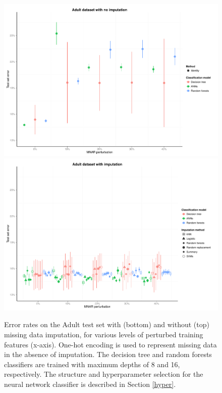 \documentclass[10pt,twocolumn,letterpaper]{article}
\begin{document}
\begin{figure}[htbp] 
   \begin{center}
   \includegraphics[scale=0.5]{figure/test-errors-adult-no-imp.pdf}
    \includegraphics[scale=0.5]{figure/test-errors-adult-imp.pdf}
   \caption{Error rates on the Adult test set with (bottom) and without (top) missing data imputation, for various levels of perturbed training features (x-axis). One-hot encoding is used to represent missing data in the absence of imputation. The decision tree and random forests classifiers are trained with maximum depths of 8 and 16, respectively. The structure and hyperparameter selection for the neural network classifier is described in Section \ref{hyper}.}
   \label{fig:test-error-adult}
      \end{center}
\end{figure}
\end{document}
